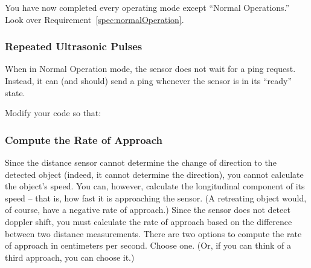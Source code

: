 You have now completed every operating mode except ``Normal Operations.''
Look over Requirement~\ref{spec:normalOperation}.

\subsubsection{Repeated Ultrasonic Pulses} \label{subsubsec:repeatedPulses}

When in Normal Operation mode, the sensor does not wait for a ping request.
Instead, it can (and should) send a ping whenever the sensor is in its ``ready'' state.

Modify your code so that:
\begin{description}
\end{description}

\subsubsection{Compute the Rate of Approach} \label{subsubsec:approachRate}

Since the distance sensor cannot determine the change of direction to the detected object (indeed, it cannot determine the direction), you cannot calculate the object's speed.
You can, however, calculate the longitudinal component of its speed -- that is, how fast it is approaching the sensor.
(A retreating object would, of course, have a negative rate of approach.)
Since the sensor does not detect doppler shift, you must calculate the rate of approach based on the difference between two distance measurements.
There are two options to compute the rate of approach in centimeters per second.
Choose one.
(Or, if you can think of a third approach, you can choose it.)

